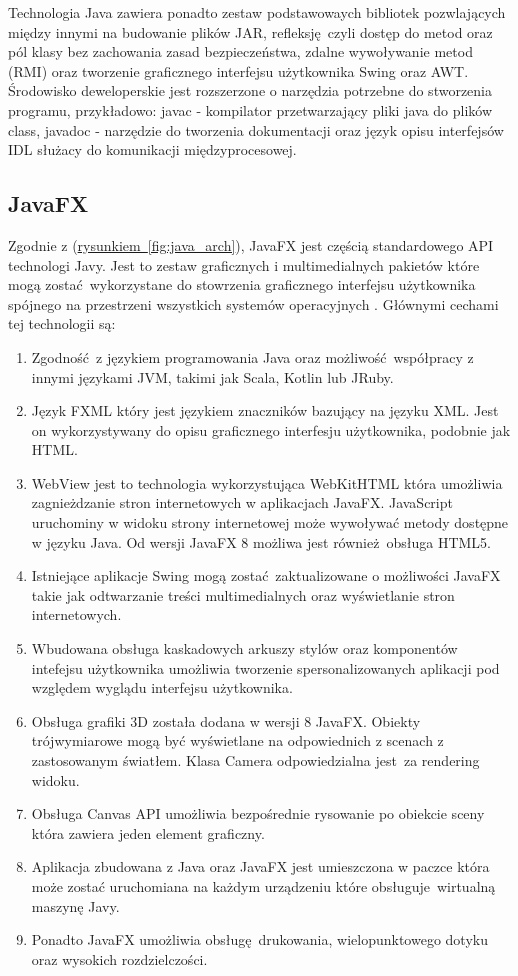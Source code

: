 Technologia Java zawiera ponadto zestaw podstawowaych bibliotek pozwlających między innymi na budowanie plików JAR, refleksję czyli dostęp do metod oraz pól klasy bez zachowania zasad bezpieczeństwa, zdalne wywoływanie metod (RMI) oraz tworzenie graficznego interfejsu użytkownika Swing oraz AWT. Środowisko deweloperskie jest rozszerzone o narzędzia potrzebne do stworzenia programu, przykładowo: javac - kompilator przetwarzający pliki java do plików class, javadoc - narzędzie do tworzenia dokumentacji oraz język opisu interfejsów IDL służacy do komunikacji międzyprocesowej.
\subsection{JavaFX}
Zgodnie z (\hyperref[fig:java_arch]{rysunkiem~\ref*{fig:java_arch}}), JavaFX jest częścią standardowego API technologi Javy. Jest to zestaw graficznych i multimedialnych pakietów które mogą zostać wykorzystane do stowrzenia graficznego interfejsu użytkownika spójnego na przestrzeni wszystkich systemów operacyjnych \cite{JavaFxInfo}. Głównymi cechami tej technologii są:
\begin{enumerate}
  \item Zgodność z językiem programowania Java oraz możliwość współpracy z innymi językami JVM, takimi jak Scala, Kotlin lub JRuby.
  \item Język FXML który jest językiem znaczników bazujący na języku XML. Jest on wykorzystywany do opisu graficznego interfesju użytkownika, podobnie jak HTML.
  \item WebView jest to technologia wykorzystująca WebKitHTML która umożliwia zagnieżdzanie stron internetowych w aplikacjach JavaFX. JavaScript uruchominy w widoku strony internetowej może wywoływać metody dostępne w języku Java. Od wersji JavaFX 8 możliwa jest również obsługa HTML5.
  \item Istniejące aplikacje Swing mogą zostać zaktualizowane o możliwości JavaFX takie jak odtwarzanie treści multimedialnych oraz wyświetlanie stron internetowych.
  \item Wbudowana obsługa kaskadowych arkuszy stylów oraz komponentów intefejsu użytkownika umożliwia tworzenie spersonalizowanych aplikacji pod względem wyglądu interfejsu użytkownika.
  \item Obsługa grafiki 3D została dodana w wersji 8 JavaFX. Obiekty trójwymiarowe mogą być wyświetlane na odpowiednich z scenach z zastosowanym światłem. Klasa Camera odpowiedzialna jest za rendering widoku.
  \item Obsługa Canvas API umożliwia bezpośrednie rysowanie po obiekcie sceny która zawiera jeden element graficzny.
  \item Aplikacja zbudowana z Java oraz JavaFX jest umieszczona w paczce która może zostać uruchomiana na każdym urządzeniu które obsługuje wirtualną maszynę Javy.
  \item Ponadto JavaFX umożliwia obsługę drukowania, wielopunktowego dotyku oraz  wysokich rozdzielczości.
\end{enumerate}

